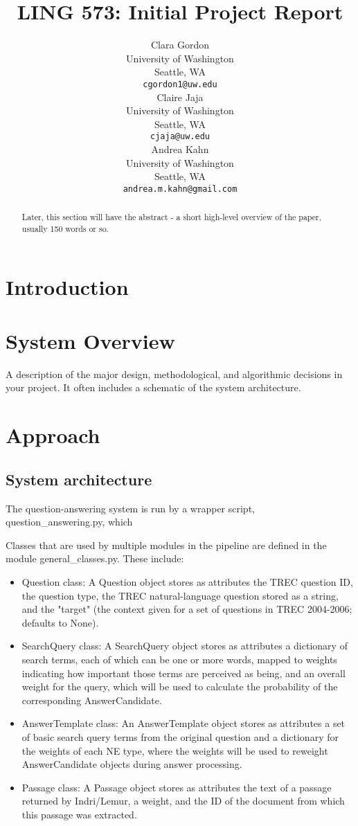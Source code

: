 \documentclass[11pt]{article}
\title{LING 573: Initial Project Report}
\author{Clara Gordon \\
  University of Washington \\
  Seattle, WA \\
  {\tt cgordon1@uw.edu} \\\And
  Claire Jaja \\
  University of Washington \\
  Seattle, WA \\
  {\tt cjaja@uw.edu} \\\And
  Andrea Kahn \\
  University of Washington \\
  Seattle, WA \\
  {\tt andrea.m.kahn@gmail.com} \\}
\date{}
\begin{document}
\maketitle
\begin{abstract}
    Later, this section will have the abstract - a short high-level overview of the paper, usually 150 words or so.
\end{abstract}

\section{Introduction}

\section{System Overview}

A description of the major design, methodological, and algorithmic decisions in your project. It often includes a schematic of the system architecture.

\section{Approach}

\subsection{System architecture}

The question-answering system is run by a wrapper script, question_answering.py, which 

Classes that are used by multiple modules in the pipeline are defined in the module general_classes.py. These include:

\begin{itemize}
\item Question class: A Question object stores as attributes the TREC question ID, the question type, the TREC natural-language question stored as a string, and the "target" (the context given for a set of questions in TREC 2004-2006; defaults to None).
\item SearchQuery class: A SearchQuery object stores as attributes a dictionary of search terms, each of which can be one or more words, mapped to weights indicating how important those terms are perceived as being, and an overall weight for the query, which will be used to calculate the probability of the corresponding AnswerCandidate.
\item AnswerTemplate class: An AnswerTemplate object stores as attributes a set of basic search query terms from the original question and a dictionary for the weights of each NE type, where the weights will be used to reweight AnswerCandidate objects during answer processing.
\item Passage class: A Passage object stores as attributes the text of a passage returned by Indri/Lemur, a weight, and the ID of the document from which this passage was extracted.
\end{itemize}
\end{document}

